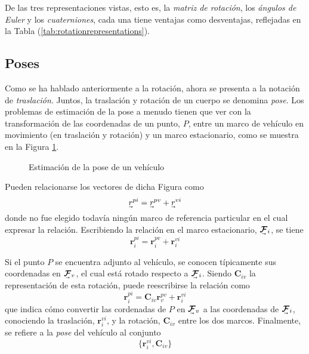 De las tres representaciones vistas, esto es, la \textit{matriz de rotación}, los \textit{ángulos de Euler} y los \textit{cuaterniones}, cada una tiene ventajas como desventajas, reflejadas en la Tabla (\ref{tab:rotationrepresentations}).



\subsection{Poses}
Como se ha hablado anteriormente a la rotación, ahora se presenta a la notación de \textit{traslación}. Juntos, la traslación y rotación de un cuerpo se denomina \textit{pose}. Los problemas de estimación de la pose a menudo tienen que ver con la transformación de las coordenadas de un punto, $P$, entre un marco de vehículo en movimiento (en traslación y rotación) y un marco estacionario, como se muestra en la Figura \ref{fig:pose}.

\begin{figure}
    \centering
    
    \caption{Estimación de la pose de un vehículo}
    \label{fig:pose}
\end{figure}

Pueden relacionarse los vectores de dicha Figura como
\begin{equation}
    \undervec{r}^{pi} = \undervec{r}^{pv}+\undervec{r}^{vi}
\end{equation}
donde no fue elegido todavía ningún marco de referencia particular en el cual expresar la relación. Escribiendo la relación en el marco estacionario, $\undervec{\bm{\mathcal{F}}}_i$, se tiene
\begin{equation}
    \bm{r}_i^{pi} = \bm{r}_i^{pv} + \bm{r}_i^{vi}
\end{equation}

Si el punto $P$ se encuentra adjunto al vehículo, se conocen típicamente sus coordenadas en $\undervec{\bm{\mathcal{F}}}_v$, el cual está rotado respecto a $\undervec{\bm{\mathcal{F}}}_i$. Siendo $\bm{C}_{iv}$ la representación de esta rotación, puede reescribirse la relación como
\begin{equation}
    \bm{r}_i^{pi} = \bm{C}_{iv}\bm{r}_v^{pv} + \bm{r}_i^{vi}
    \label{eq:poseconvertion}
\end{equation}
que indica cómo convertir las cordenadas de $P$ en $\undervec{\bm{\mathcal{F}}}_v$ a las coordenadas de $\undervec{\bm{\mathcal{F}}}_i$, conociendo la traslación, $\bm{r}_i^{vi}$, y la rotación, $\bm{C}_{iv}$ entre los dos marcos. Finalmente, se refiere a la \textit{pose} del vehículo al conjunto
\begin{equation}
    \{\bm{r}_i^{vi},\bm{C}_{iv}\}
\end{equation}

